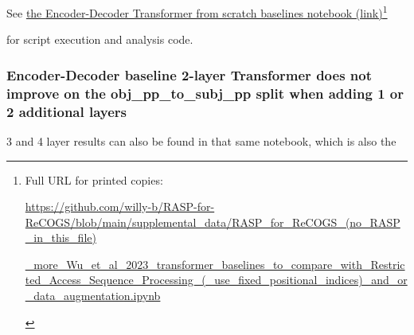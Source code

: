 \documentclass[11pt]{article}
\begin{document}
See \href{https://github.com/willy-b/RASP-for-ReCOGS/blob/main/supplemental\_data/RASP\_for\_ReCOGS\_(no\_RASP\_in\_this\_file)\_more\_Wu\_et\_al\_2023\_transformer\_baselines\_to\_compare\_with\_Restricted\_Access\_Sequence\_Processing\_(\_use\_fixed\_positional\_indices)\_and\_or\_data\_augmentation.ipynb}{the Encoder-Decoder Transformer from scratch baselines notebook (link)}\footnote{\begin{tiny}Full URL for printed copies: 

\href{https://github.com/willy-b/RASP-for-ReCOGS/blob/main/supplemental\_data/RASP\_for\_ReCOGS\_(no\_RASP\_in\_this\_file)\_more\_Wu\_et\_al\_2023\_transformer\_baselines\_to\_compare\_with\_Restricted\_Access\_Sequence\_Processing\_(\_use\_fixed\_positional\_indices)\_and\_or\_data\_augmentation.ipynb}{https://github.com/willy-b/RASP-for-ReCOGS/blob/main/supplemental\_data/RASP\_for\_ReCOGS\_(no\_RASP\_in\_this\_file)}

\href{https://github.com/willy-b/RASP-for-ReCOGS/blob/main/supplemental\_data/RASP\_for\_ReCOGS\_(no\_RASP\_in\_this\_file)\_more\_Wu\_et\_al\_2023\_transformer\_baselines\_to\_compare\_with\_Restricted\_Access\_Sequence\_Processing\_(\_use\_fixed\_positional\_indices)\_and\_or\_data\_augmentation.ipynb}{\_more\_Wu\_et\_al\_2023\_transformer\_baselines\_to\_compare\_with\_Restricted\_Access\_Sequence\_Processing\_(\_use\_fixed\_positional\_indices)\_and\_or\_data\_augmentation.ipynb}\end{tiny}}

for \citep{Wu2023} script execution and analysis code.

\subsubsection{\citep{Wu2023} Encoder-Decoder baseline 2-layer Transformer does not improve on the obj\_pp\_to\_subj\_pp split when adding 1 or 2 additional layers}

3 and 4 layer results can also be found in that same notebook, which is also the
\end{document}

